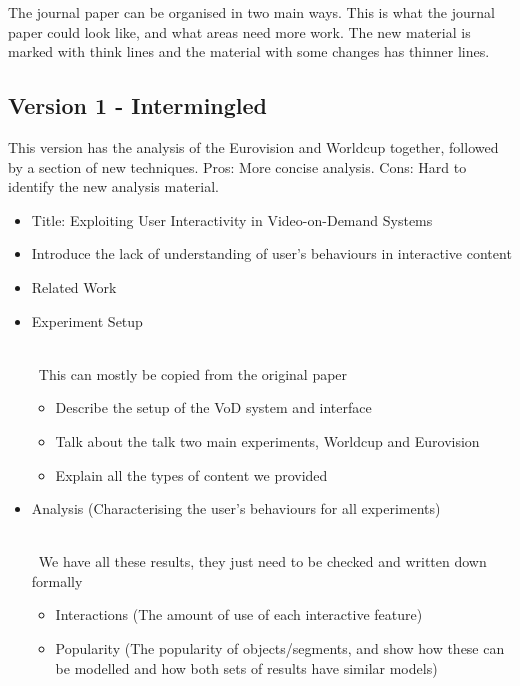 \documentclass[a4paper]{article}
\newcommand{\note}[1]{
    {~\\~\color{red}\sf #1 }
}
\begin{document}
The journal paper can be organised in two main ways. This is what the journal paper could look like, and what areas need more work. The new material is marked with think lines and the material with some changes has thinner lines.

\subsection{Version 1 - Intermingled}
This version has the analysis of the Eurovision and Worldcup together, followed by a section of new techniques. Pros: More concise analysis. Cons: Hard to identify  the new analysis material.

\begin{itemize}

    \item Title: Exploiting User Interactivity in Video-on-Demand Systems

    \item Introduce the lack of understanding of user's behaviours in interactive content

    \item Related Work

    \item Experiment Setup
        \note{This can mostly be copied from the original paper}

        \begin{itemize}
            \item Describe the setup of the VoD system and interface

\cbstart
            \item Talk about the talk two main experiments, Worldcup and Eurovision
            \item Explain all the types of content we provided
\cbend
        \end{itemize}

\cbstart
    \item Analysis (Characterising the user's behaviours for all experiments)
        \note{We have all these results, they just need to be checked and written down formally}

        \begin{itemize}
            \item Interactions (The amount of use of each interactive feature)

            \item Popularity (The popularity of objects/segments, and show how these can be modelled and how both sets of results have similar models)


\end{itemize}
\end{itemize}
\end{document}
